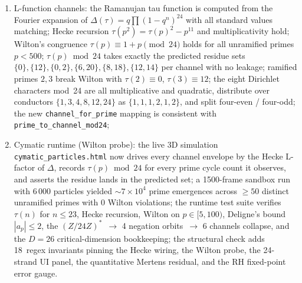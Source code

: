 \documentclass[11pt,a4paper]{article}
\theoremstyle{plain}
\theoremstyle{definition}
\theoremstyle{remark}
\numberwithin{equation}{section}
\begin{document}
\begin{enumerate}
    discrepancy \(2\,s_4\) vanishes, the fold is the unique midpoint
    between the coupling signs, 6~bivector channels from \(\binom42\),
    3~boosts + 3~rotations, the Euler product factored by channel equals
    the full product, all channels are populated, and     the channel
    assignment is deterministic; mod-24 units
    \(\{1,5,7,11,13,17,19,23\}\) form~8 elements, the negation
    involution \(a\mapsto -a\bmod 24\) gives~4 orbits
    \(\{1,23\},\{5,19\},\{7,17\},\{11,13\}\), adding the~2 ramified
    primes gives~6 channels matching the~6 bivectors; paired residues
    share channels; ramified primes map to boost channels;
  \item L-function channels: the Ramanujan tau function is computed
    from the Fourier expansion of \(\Delta(\tau)=q\prod(1-q^n)^{24}\)
    with all standard values matching; Hecke recursion
    \(\tau(p^2)=\tau(p)^2-p^{11}\) and multiplicativity hold;
    Wilton's congruence \(\tau(p)\equiv1+p\pmod{24}\) holds for all
    unramified primes \(p<500\); \(\tau(p)\bmod24\) takes exactly
    the predicted residue sets
    \(\{0\},\{12\},\{0,2\},\{6,20\},\{8,18\},\{12,14\}\) per channel
    with no leakage; ramified primes \(2,3\) break Wilton with
    \(\tau(2)\equiv0\), \(\tau(3)\equiv12\); the eight Dirichlet
    characters mod~24 are all multiplicative and quadratic, distribute
    over conductors \(\{1,3,4,8,12,24\}\) as \(\{1,1,1,2,1,2\}\),
    and split four-even / four-odd; the new
    \texttt{channel\_for\_prime} mapping is consistent with
    \texttt{prime\_to\_channel\_mod24};
  \item Cymatic runtime (Wilton probe): the live 3D simulation
    \texttt{cymatic\_particles.html} now drives every channel
    envelope by the Hecke L-factor of \(\Delta\), records
    \(\tau(p)\bmod24\) for every prime cycle count it observes, and
    asserts the residue lands in the predicted set; a 1500-frame
    sandbox run with 6\,000 particles yielded \(\sim7\times10^{4}\)
    prime emergences across \(\ge 50\) distinct unramified primes
    with \(0\) Wilton violations; the runtime test suite verifies
    \(\tau(n)\) for \(n\le23\), Hecke recursion, Wilton on
    \(p\in[5,100)\), Deligne's bound \(|a_p|\le 2\), the
    \((Z/24Z)^{\!*}\)~\(\to\) 4 negation orbits~\(\to\) 6 channels
    collapse, and the \(D=26\) critical-dimension bookkeeping;
    the structural check adds 18~regex invariants pinning the
    Hecke wiring, the Wilton probe, the 24-strand UI panel,
    the quantitative Mertens residual, and the
    RH fixed-point error gauge.
\end{enumerate}
\end{document}
